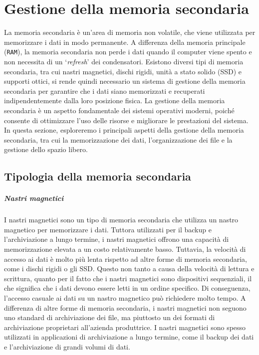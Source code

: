 \chapter{Gestione della memoria secondaria}

La memoria secondaria è un'area di memoria non volatile, che viene utilizzata per memorizzare i dati in modo permanente. A differenza della memoria principale (\texttt{RAM}), la memoria secondaria non perde i dati quando il computer viene spento e non necessita di un `\textit{refresh}' dei condensatori. Esistono diversi tipi di memoria secondaria, tra cui nastri magnetici, dischi rigidi, unità a stato solido (SSD) e supporti ottici, si rende quindi necessario un sistema di gestione della memoria secondaria per garantire che i dati siano memorizzati e recuperati indipendentemente dalla loro posizione fisica. La gestione della memoria secondaria è un aspetto fondamentale dei sistemi operativi moderni, poiché consente di ottimizzare l'uso delle risorse e migliorare le prestazioni del sistema. In questa sezione, esploreremo i principali aspetti della gestione della memoria secondaria, tra cui la memorizzazione dei dati, l'organizzazione dei file e la gestione dello spazio libero.

\section{Tipologia della memoria secondaria}
    \paragraph{Nastri magnetici}
        I nastri magnetici sono un tipo di memoria secondaria che utilizza un nastro magnetico per memorizzare i dati. Tuttora utilizzati per il backup e l'archiviazione a lungo termine, i nastri magnetici offrono una capacità di memorizzazione elevata a un costo relativamente basso. Tuttavia, la velocità di accesso ai dati è molto più lenta rispetto ad altre forme di memoria secondaria, come i dischi rigidi o gli SSD. Questo non tanto a causa della velocità di lettura e scrittura, quanto per il fatto che i nastri magnetici sono dispositivi sequenziali, il che significa che i dati devono essere letti in un ordine specifico. Di conseguenza, l'accesso casuale ai dati su un nastro magnetico può richiedere molto tempo. A differenza di altre forme di memoria secondaria, i nastri magnetici non seguono uno standard di archiviazione dei file, ma piuttosto un dei formati di archiviazione proprietari all'azienda produttrice. I nastri magnetici sono spesso utilizzati in applicazioni di archiviazione a lungo termine, come il backup dei dati e l'archiviazione di grandi volumi di dati.
